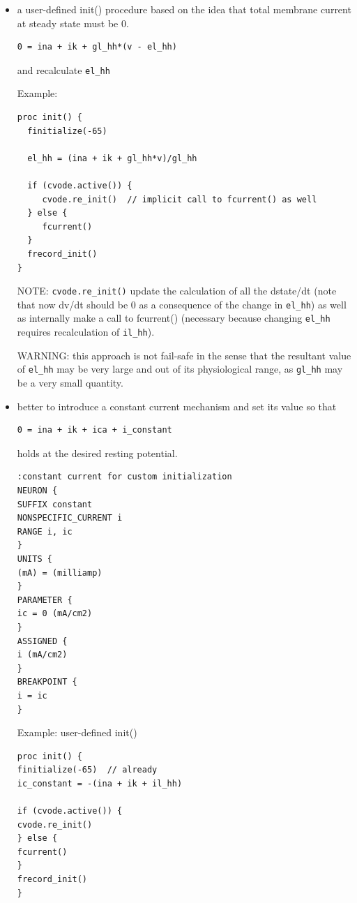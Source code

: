\begin{itemize}
  \item  a user-defined
init() procedure based on the idea that total
membrane current at steady state must be 0. 

\begin{verbatim}
0 = ina + ik + gl_hh*(v - el_hh)
\end{verbatim}
and recalculate \verb!el_hh! 
 
Example:
\begin{verbatim}
proc init() {
  finitialize(-65)
  
  el_hh = (ina + ik + gl_hh*v)/gl_hh

  if (cvode.active()) {
     cvode.re_init()  // implicit call to fcurrent() as well
  } else {
     fcurrent()
  }
  frecord_init()
}
\end{verbatim}

NOTE: \verb!cvode.re_init()! update the calculation of all the
dstate/dt (note that now dv/dt should be 0 as a consequence of the change in
\verb!el_hh!) as well as internally make a call to fcurrent() (necessary because
changing \verb!el_hh! requires recalculation of \verb!il_hh!).

WARNING: this approach is not fail-safe in the sense that the resultant value of
\verb!el_hh! may be very large and out of its physiological range, as
\verb!gl_hh! may be a very small quantity.
 
 
    \item better to introduce a constant current mechanism and set its value so
    that 
    
\begin{verbatim}
0 = ina + ik + ica + i_constant
\end{verbatim}
holds at the desired resting potential.

\begin{verbatim}
:constant current for custom initialization
NEURON {
SUFFIX constant
NONSPECIFIC_CURRENT i
RANGE i, ic
}
UNITS {
(mA) = (milliamp)
}
PARAMETER {
ic = 0 (mA/cm2)
}
ASSIGNED {
i (mA/cm2)
}
BREAKPOINT {
i = ic
}
\end{verbatim}

Example: user-defined init()
\begin{verbatim}
proc init() {
finitialize(-65)  // already
ic_constant = -(ina + ik + il_hh)

if (cvode.active()) {
cvode.re_init()
} else {
fcurrent()
}
frecord_init()
}
\end{verbatim}

\end{itemize}


